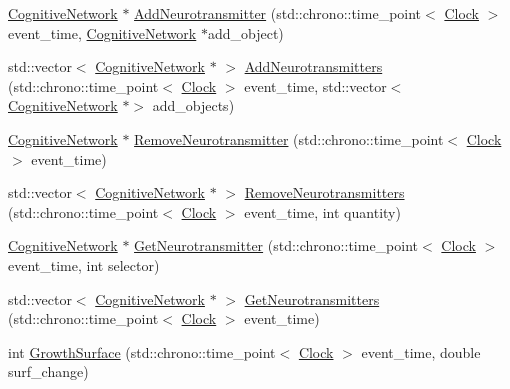 \begin{DoxyCompactItemize}
\item 
\mbox{\hyperlink{classCognitiveNetwork}{Cognitive\+Network}} $\ast$ \mbox{\hyperlink{classSynapticVesicle_a56d406fdd01f267d868caedb390080ff}{Add\+Neurotransmitter}} (std\+::chrono\+::time\+\_\+point$<$ \mbox{\hyperlink{universe_8h_a0ef8d951d1ca5ab3cfaf7ab4c7a6fd80}{Clock}} $>$ event\+\_\+time, \mbox{\hyperlink{classCognitiveNetwork}{Cognitive\+Network}} $\ast$add\+\_\+object)
\item 
std\+::vector$<$ \mbox{\hyperlink{classCognitiveNetwork}{Cognitive\+Network}} $\ast$ $>$ \mbox{\hyperlink{classSynapticVesicle_ac924e6b7b824066a89136e52f2d5ce80}{Add\+Neurotransmitters}} (std\+::chrono\+::time\+\_\+point$<$ \mbox{\hyperlink{universe_8h_a0ef8d951d1ca5ab3cfaf7ab4c7a6fd80}{Clock}} $>$ event\+\_\+time, std\+::vector$<$ \mbox{\hyperlink{classCognitiveNetwork}{Cognitive\+Network}} $\ast$$>$ add\+\_\+objects)
\item 
\mbox{\hyperlink{classCognitiveNetwork}{Cognitive\+Network}} $\ast$ \mbox{\hyperlink{classSynapticVesicle_a7ea7841bd1a7a17c78a023db8860cc22}{Remove\+Neurotransmitter}} (std\+::chrono\+::time\+\_\+point$<$ \mbox{\hyperlink{universe_8h_a0ef8d951d1ca5ab3cfaf7ab4c7a6fd80}{Clock}} $>$ event\+\_\+time)
\item 
std\+::vector$<$ \mbox{\hyperlink{classCognitiveNetwork}{Cognitive\+Network}} $\ast$ $>$ \mbox{\hyperlink{classSynapticVesicle_aab1e61b4910399d56071ca59f2758e72}{Remove\+Neurotransmitters}} (std\+::chrono\+::time\+\_\+point$<$ \mbox{\hyperlink{universe_8h_a0ef8d951d1ca5ab3cfaf7ab4c7a6fd80}{Clock}} $>$ event\+\_\+time, int quantity)
\item 
\mbox{\hyperlink{classCognitiveNetwork}{Cognitive\+Network}} $\ast$ \mbox{\hyperlink{classSynapticVesicle_a3bdf4423899d438b5a1d2246c52c8c45}{Get\+Neurotransmitter}} (std\+::chrono\+::time\+\_\+point$<$ \mbox{\hyperlink{universe_8h_a0ef8d951d1ca5ab3cfaf7ab4c7a6fd80}{Clock}} $>$ event\+\_\+time, int selector)
\item 
std\+::vector$<$ \mbox{\hyperlink{classCognitiveNetwork}{Cognitive\+Network}} $\ast$ $>$ \mbox{\hyperlink{classSynapticVesicle_ada95d85873125115208ff51f60fa72e9}{Get\+Neurotransmitters}} (std\+::chrono\+::time\+\_\+point$<$ \mbox{\hyperlink{universe_8h_a0ef8d951d1ca5ab3cfaf7ab4c7a6fd80}{Clock}} $>$ event\+\_\+time)
\item 
int \mbox{\hyperlink{classSynapticVesicle_a045f27b28b8b11edc884568b390c22fe}{Growth\+Surface}} (std\+::chrono\+::time\+\_\+point$<$ \mbox{\hyperlink{universe_8h_a0ef8d951d1ca5ab3cfaf7ab4c7a6fd80}{Clock}} $>$ event\+\_\+time, double surf\+\_\+change)
$$
\end{DoxyCompactItemize}
